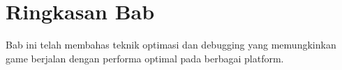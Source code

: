 \section{Ringkasan Bab}

Bab ini telah membahas teknik optimasi dan debugging yang memungkinkan game berjalan dengan performa optimal pada berbagai platform.
